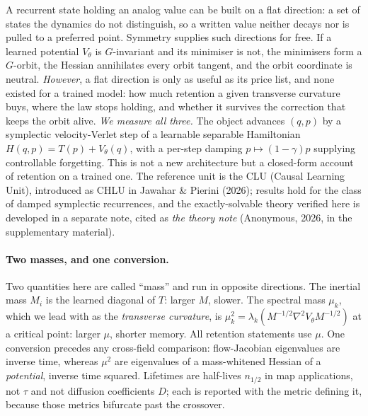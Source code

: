 \documentclass{article}
\begin{document}
A recurrent state holding an analog value can be built on a flat direction: a set of states the dynamics do not distinguish, so a written value neither decays nor is pulled to a preferred point. Symmetry supplies such directions for free. If a learned potential $V_\theta$ is $G$-invariant and its minimiser is not, the minimisers form a $G$-orbit, the Hessian annihilates every orbit tangent, and the orbit coordinate is neutral. \emph{However}, a flat direction is only as useful as its price list, and none existed for a trained model: how much retention a given transverse curvature buys, where the law stops holding, and whether it survives the correction that keeps the orbit alive. \emph{We measure all three.} The object advances $(q,p)$ by a symplectic velocity-Verlet step of a learnable separable Hamiltonian $H(q,p)=T(p)+V_\theta(q)$, with a per-step damping $p\mapsto(1-\gamma)p$ supplying controllable forgetting. This is not a new architecture but a closed-form account of retention on a trained one. The reference unit is the CLU (Causal Learning Unit), introduced as CHLU in Jawahar \& Pierini (2026); results hold for the class of damped symplectic recurrences, and the exactly-solvable theory verified here is developed in a separate note, cited as \emph{the theory note} (Anonymous, 2026, in the supplementary material).

\paragraph{Two masses, and one conversion.} Two quantities here are called ``mass'' and run in opposite directions. The inertial mass $M_i$ is the learned diagonal of $T$: larger $M$, slower. The spectral mass $\mu_k$, which we lead with as the \emph{transverse curvature}, is $\mu_k^2=\lambda_k(M^{-1/2}\nabla^2V_\theta M^{-1/2})$ at a critical point: larger $\mu$, shorter memory. All retention statements use $\mu$. One conversion precedes any cross-field comparison: flow-Jacobian eigenvalues are inverse time, whereas $\mu^2$ are eigenvalues of a mass-whitened Hessian of a \emph{potential}, inverse time squared. Lifetimes are half-lives $n_{1/2}$ in map applications, not $\tau$ and not diffusion coefficients $D$; each is reported with the metric defining it, because those metrics bifurcate past the crossover.
\end{document}
